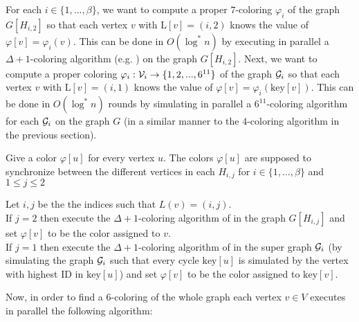\documentclass{article}
\theoremstyle{definition}
\begin{document}
For each $i \in \{1, ..., \beta\}$, we want to compute a proper $7$-coloring $\varphi_{i}$ of the graph $G[H_{i,2}]$ so that each vertex $v$ with $\text{L}[v] = (i,2)$ knows the value of $\varphi[v] = \varphi_{i}(v)$. This can be done in $O(\log^{*}n)$ by executing in parallel a $\Delta+1$-coloring algorithm (e.g. \cite{Goldberg87}) on the graph $G[H_{i,2}]$. Next, we want to compute a proper coloring $\varphi_{i}:{\cal V}_{i} \to \{1,2,...,6^{11}\}$ of the graph ${\cal G}_{i}$ so that each vertex $v$ with $\text{L}[v] = (i,1)$ knows the value of $\varphi[v] = \varphi_{i}(\text{key}[v])$. This can be done in $O(\log^{*}n)$ rounds by simulating in parallel a $6^{11}$-coloring algorithm for each ${\cal G}_{i}$ on the graph $G$ (in a similar manner to the $4$-coloring algorithm in the previous section). \medskip \smallskip

\begin{algorithm}[H]\label{Alg6ColorSuperGraph}\small
	\caption{Give a color $\varphi[u]$ for every vertex $u$. The colors $\varphi[u]$ are supposed to synchronize between the different vertices in each $H_{i,j}$ for $i \in \{1, ..., \beta\}$ and $1 \leq j \leq 2$}
\SetInd{1em}{0em}
Let $i,j$ be the the indices such that $L(v) = (i,j)$.\\
If $j=2$ then execute the $\Delta+1$-coloring algorithm of \cite{Goldberg87} in the graph $G[H_{i,j}]$ and set $\varphi[v]$ to be the color assigned to $v$.\\
If $j=1$  then execute the $\Delta+1$-coloring algorithm of \cite{Goldberg87} in the super graph ${\cal G}_i$ (by simulating the graph ${\cal G}_i$ such that every cycle $\text{key}[u]$ is simulated by the vertex with highest ID in $\text{key}[u]$) and set $\varphi[v]$ to be the color assigned to $\text{key}[v]$.\label{alg2:col6}

\end{algorithm}

\medskip \smallskip

Now, in order to find a $6$-coloring of the whole graph each vertex $v \in V$ executes in parallel the following algorithm:
\medskip \smallskip
\end{document}
